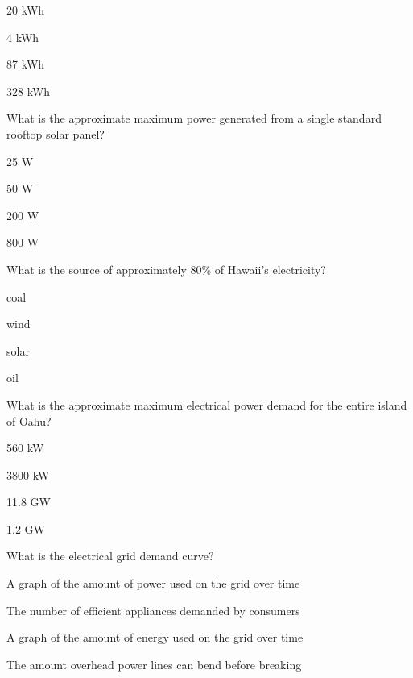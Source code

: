 \documentclass[11pt]{article}
\begin{document}
\begin{answer}
	\item 20 kWh
	\item 4 kWh
	\item 87 kWh
	\item 328 kWh
\end{answer}

\begin{question}
	\item What is the approximate maximum power generated from a single standard rooftop solar panel?
\end{question}

\begin{answer}
	\item 25 W
	\item 50 W
	\item 200 W
	\item 800 W
\end{answer}

\pagebreak

\begin{question}
	\item What is the source of approximately 80\% of Hawaii's electricity?
\end{question}

\begin{answer}
	\item coal
	\item wind
	\item solar
	\item oil
\end{answer}

\begin{question}
	\item What is the approximate maximum electrical power demand for the entire island of Oahu?
\end{question}

\begin{answer}
	\item 560 kW
	\item 3800 kW
	\item 11.8 GW
	\item 1.2 GW
\end{answer}

\begin{question}
	\item What is the electrical grid demand curve?
\end{question}

\begin{answer}
	\item A graph of the amount of power used on the grid over time
	\item The number of efficient appliances demanded by consumers
	\item A graph of the amount of energy used on the grid over time
	\item The amount overhead power lines can bend before breaking
\end{answer}
\end{document}
